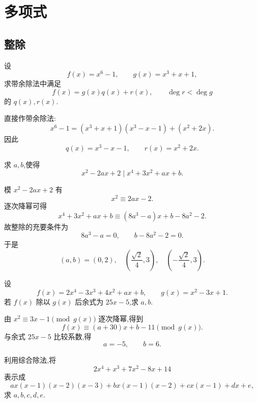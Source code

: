 \setcounter{chapter}{0}
\pagestyle{fancy}

\chapter{多项式}

\section{整除}

\begin{example}
设
\[
  f(x)=x^6-1,\qquad g(x)=x^3+x+1,
\]
求带余除法中满足
\[
  f(x)=g(x)q(x)+r(x),\qquad \deg r<\deg g
\]
的 $q(x),r(x)$.
\end{example}
\exampleblank

\begin{solution}
直接作带余除法:
\[
  x^6-1=(x^3+x+1)(x^3-x-1)+(x^2+2x).
\]
因此
\[
  q(x)=x^3-x-1,\qquad r(x)=x^2+2x.
\]
\end{solution}

\begin{example}
求 $a,b$,使得
\[
  x^2-2ax+2\mid x^4+3x^2+ax+b.
\]
\end{example}
\exampleblank

\begin{solution}
模 $x^2-2ax+2$ 有
\[
  x^2\equiv 2ax-2.
\]
逐次降幂可得
\[
  x^4+3x^2+ax+b
  \equiv (8a^3-a)x+b-8a^2-2.
\]
故整除的充要条件为
\[
  8a^3-a=0,\qquad b-8a^2-2=0.
\]
于是
\[
  (a,b)=(0,2),\quad
  \left(\dfrac{\sqrt2}{4},3\right),\quad
  \left(-\dfrac{\sqrt2}{4},3\right).
\]
\end{solution}

\begin{example}
设
\[
  f(x)=2x^4-3x^3+4x^2+ax+b,
  \qquad
  g(x)=x^2-3x+1.
\]
若 $f(x)$ 除以 $g(x)$ 后余式为 $25x-5$,求 $a,b$.
\end{example}
\exampleblank

\begin{solution}
由 $x^2\equiv3x-1\pmod{g(x)}$ 逐次降幂,得到
\[
  f(x)\equiv (a+30)x+b-11\pmod{g(x)}.
\]
与余式 $25x-5$ 比较系数,得
\[
  a=-5,\qquad b=6.
\]
\end{solution}

\begin{example}[\markstar]
利用综合除法,将
\[
  2x^4+x^3+7x^2-8x+14
\]
表示成
\[
  ax(x-1)(x-2)(x-3)
  +bx(x-1)(x-2)
  +cx(x-1)+dx+e,
\]
求 $a,b,c,d,e$.
\end{example}
\exampleblank

